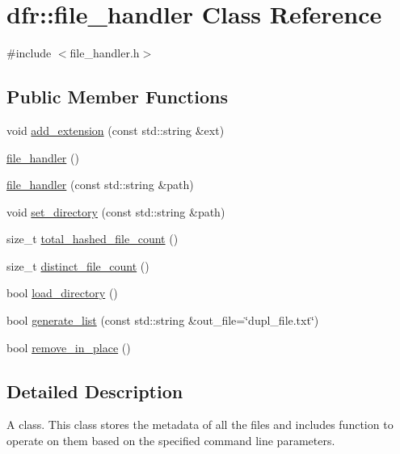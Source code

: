 \hypertarget{classdfr_1_1file__handler}{}\section{dfr\+:\+:file\+\_\+handler Class Reference}
\label{classdfr_1_1file__handler}


{\ttfamily \#include $<$file\+\_\+handler.\+h$>$}

\subsection*{Public Member Functions}
\begin{DoxyCompactItemize}
\item 
void \hyperlink{classdfr_1_1file__handler_a20fc78cc7b36636e205fcc8c60180913}{add\+\_\+extension} (const std\+::string \&ext)
\item 
\hyperlink{classdfr_1_1file__handler_a4cf5973679b5c61ae132cd20787e105b}{file\+\_\+handler} ()
\item 
\hyperlink{classdfr_1_1file__handler_a63d08b4e326aa6b1e76cf8143ff7fc10}{file\+\_\+handler} (const std\+::string \&path)
\item 
void \hyperlink{classdfr_1_1file__handler_ad01dc1e6e7c2113037911fa16ff670a4}{set\+\_\+directory} (const std\+::string \&path)
\item 
size\+\_\+t \hyperlink{classdfr_1_1file__handler_a9a25337ad0c91b1ee382b58964da8a73}{total\+\_\+hashed\+\_\+file\+\_\+count} ()
\item 
size\+\_\+t \hyperlink{classdfr_1_1file__handler_a48ae88f3c06892cdded35b8729f84db4}{distinct\+\_\+file\+\_\+count} ()
\item 
bool \hyperlink{classdfr_1_1file__handler_af5f8eb67a3fd30d78fb299fa1999eaae}{load\+\_\+directory} ()
\item 
bool \hyperlink{classdfr_1_1file__handler_a27ab58642473b9e8dd631dd7f2ed89e3}{generate\+\_\+list} (const std\+::string \&out\+\_\+file=\char`\"{}dupl\+\_\+file.\+txt\char`\"{})
\item 
bool \hyperlink{classdfr_1_1file__handler_a00f8b53f3689b8b0c38102d6d8a6926c}{remove\+\_\+in\+\_\+place} ()
\end{DoxyCompactItemize}


\subsection{Detailed Description}
A class. This class stores the metadata of all the files and includes function to operate on them based on the specified command line parameters. 

